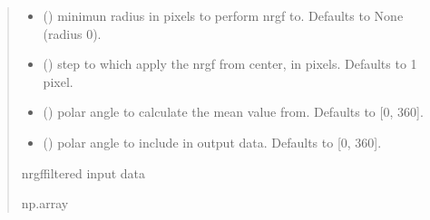 \documentclass[letterpaper,10pt,english]{sphinxmanual}
\begin{document}
\begin{fulllineitems}
\begin{quote}
\begin{description}
\begin{itemize}
\item {} 
\sphinxAtStartPar
{} (\sphinxstyleliteralemphasis{\sphinxupquote{, }}) \textendash{} minimun radius in pixels to perform nrgf to. Defaults to None (radius 0).

\item {} 
\sphinxAtStartPar
{} (\sphinxstyleliteralemphasis{\sphinxupquote{, }}) \textendash{} step to which apply the nrgf from center, in pixels. Defaults to 1 pixel.

\item {} 
\sphinxAtStartPar
{} (\sphinxstyleliteralemphasis{\sphinxupquote{{[}}}\sphinxstyleliteralemphasis{\sphinxupquote{, }}\sphinxstyleliteralemphasis{\sphinxupquote{{]}}}\sphinxstyleliteralemphasis{\sphinxupquote{, }}) \textendash{} polar angle to calculate the mean value from. Defaults to {[}0, 360{]}.

\item {} 
\sphinxAtStartPar
{} (\sphinxstyleliteralemphasis{\sphinxupquote{{[}}}\sphinxstyleliteralemphasis{\sphinxupquote{, }}\sphinxstyleliteralemphasis{\sphinxupquote{{]}}}\sphinxstyleliteralemphasis{\sphinxupquote{, }}) \textendash{} polar angle to include in output data. Defaults to {[}0, 360{]}.

\end{itemize}

\sphinxAtStartPar
nrgf\sphinxhyphen{}filtered input data

\sphinxAtStartPar
np.array

\end{description}\end{quote}

\end{fulllineitems}
\end{document}
